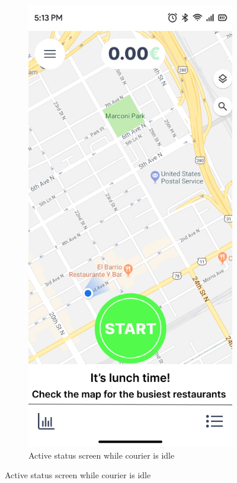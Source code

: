 \begin{figure}[H]
\begin{subfigure}[b]{0.48\textwidth}
        \includegraphics[width=\textwidth]{images/go_screen.png}
        \caption{Active status screen while courier is idle}

\end{subfigure}
\end{figure}
